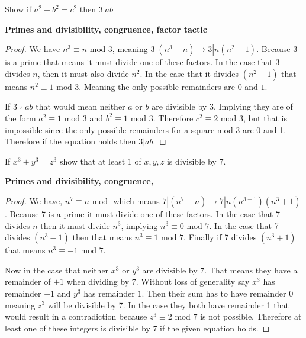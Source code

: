 \documentclass[11pt]{article}
\newenvironment{problem}[2][Problem\!]{\begin{trivlist}
\item[\hskip \labelsep {\bfseries #1}\hskip \labelsep {\bfseries #2}]}{\end{trivlist}}
\begin{document}
\begin{tcolorbox}
  \begin{problem} {IC | 11/10 | 135.} Show if $a^{2} + b^{2} = c^{2}$ then $3| ab$
  \end{problem}
  \textbf{Primes and divisibility, congruence, factor tactic}
\end{tcolorbox}
\begin{proof}
  We have $n^{3} \equiv n \text{ mod }3$, meaning $3|(n^{3}-n)\rightarrow 3|n(n^{2}-1)$. Because 3 is a prime that means it must divide one of these factors. In the case that 3 divides $n$, then it must also divide $n^{2}$. In the case that it divides $(n^{2}-1)$ that means $n^{2}\equiv 1 \text{ mod }3$. Meaning the only possible remainders are $0$ and $1$. 

  If $3 \nmid ab$ that would mean neither $a$ or $b$ are divisible by $3$. Implying they are of the form $a^{2} \equiv 1\text{ mod }3$ and $b^{2} \equiv 1\text{ mod }3$. Therefore $c^{2} \equiv 2 \text{ mod } 3$, but that is impossible since the only possible remainders for a square mod 3 are 0 and 1. Therefore if the equation holds then $3|ab$.
\end{proof}

\begin{tcolorbox}
  \begin{problem} {IC | 11/10 | 136.} If $x^{3} + y^{3} = z^{3}$ show that at least 1 of $x,y,z$ is divisible by $7$.    
  \end{problem}
  \textbf{Primes and divisibility, congruence, }
\end{tcolorbox}
\begin{proof}
  We have, $n^{7} \equiv n \text{ mod }$ which means $7| (n^{7}-n) \rightarrow 7|n(n^{3-1})(n^{3} + 1)$. Because 7 is a prime it must divide one of these factors. In the case that 7 divides $n$ then it must divide $n^{3}$, implying $n^{3} \equiv 0 \text{ mod }7$. In the case that 7 divides $(n^{3}-1)$ then that means $n^{3} \equiv 1 \text{ mod }7 $. Finally if 7 divides $(n^{3} + 1)$ that means $n^{3} \equiv -1 \text{ mod }7$. 

  Now in the case that neither $x^{3}$ or $y^{3}$ are divisible by 7. That means they have a remainder of $\pm 1$ when dividing by 7. Without loss of generality say $x^{3}$ has remainder $-1$ and $y^{3}$ has remainder $1$. Then their sum has to have remainder 0 meaning $z^{3}$ will be divisible by 7. In the case they both have remainder 1 that would result in a contradiction because $z^{3} \equiv 2 \text{ mod }7$ is not possible. Therefore at least one of these integers is divisible by 7 if the given equation holds. 
\end{proof}
\end{document}
